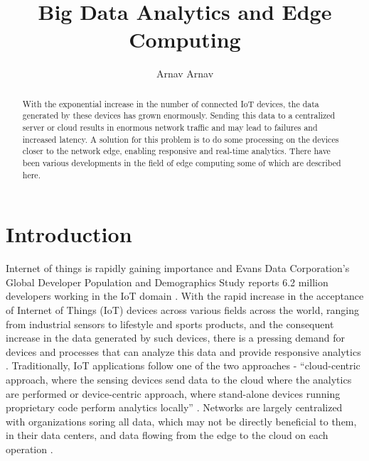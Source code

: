 \documentclass[sigconf]{acmart}
\begin{document}
\title{Big Data Analytics and Edge Computing}


\author{Arnav Arnav}

\begin{abstract}
With the exponential increase in the number of connected IoT devices, the data generated by these devices has grown enormously. Sending this data to a centralized server or cloud results in enormous network traffic and may lead to failures and increased latency. A solution for this problem is to do some processing on the devices closer to the network edge, enabling responsive and real-time analytics. There have been various developments in the field of edge computing some of which are described here.
\end{abstract}

\maketitle
\section{Introduction}
Internet of things is rapidly gaining importance and Evans Data Corporation’s Global Developer Population and Demographics Study reports 6.2 million developers working in the IoT domain \cite{ibm-data-streaming-analytics}. With the rapid increase in the acceptance of Internet of Things (IoT) devices across various fields across the world, ranging from industrial sensors to lifestyle and sports products, and the consequent increase in the data generated by such devices, there is a pressing demand for devices and processes that can analyze this data and provide responsive analytics \cite{ieee-iot-cloud-analytics-newsletter}. Traditionally, IoT applications follow one of the two approaches - ``cloud-centric approach, where the sensing devices send data to the cloud where the analytics are performed or device-centric approach, where stand-alone devices running proprietary code perform analytics locally'' \cite{ieee-iot-cloud-analytics-newsletter}. Networks are largely centralized with  organizations soring all data, which may not be directly beneficial to them, in their data centers, and data flowing from the edge to the cloud on each operation \cite{ibm-iot-edge}.
\end{document}
